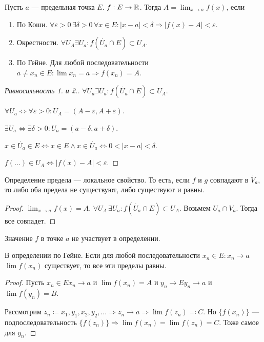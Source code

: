 \begin{definition}
    Пусть $a$ --- предельная точка  $E$.  $f: E \to \mathbb{R}$. Тогда  $A = \lim_{x\to a} f(x)$, если
     \begin{enumerate}
         \item По Коши. $\forall \varepsilon > 0\, \exists \delta >0 \, \forall x \in E: |x-a| < \delta \Rightarrow |f(x) - A| < \varepsilon$.
         \item Окрестности. $\forall U_A \exists U_a: f(\dot{U_a} \cap E) \subset U_A$.
         \item По Гейне. Для любой последовательности  $a \neq x_n \in E: \lim x_n = a \Rightarrow f(x_n) = A$.
    \end{enumerate}
\end{definition}
\begin{proof}[Равносильность 1. и 2.]
    $\forall U_a \exists U_a: f(\dot{U_a} \cap E) \subset U_A$.  

    $\forall U_a \iff \forall \varepsilon > 0: U_A = (A - \varepsilon, A + \varepsilon)$. 

    $\exists U_a \iff \exists \delta > 0: U_a = (a - \delta, a + \delta)$.  

    $x \in \dot{U_a} \in E \iff x \in E \land x \in \dot{U_a} \iff 0 < |x-a|<\delta$.  

    $f(\ldots)\in U_A \iff |f(x) - A| < \varepsilon$.
\end{proof}
\begin{property}
    Определение предела --- локальное свойство. То есть, если $f$ и  $g$ совпадают в  $\dot{V_a}$, то либо оба предела не существуют, либо существуют и равны.
\end{property}
\begin{proof}
    $\lim_{x\to a} f(x) = A$.  $\forall U_A \, \exists U_a: f(\dot{U_a} \cap E) \subset U_A$. Возьмем $U_a \cap V_a$. Тогда все совпадет.
\end{proof}
\begin{property}
    Значение $f$ в точке  $a$ не участвует в определении.
\end{property}
\begin{property}
    В определении по Гейне. Если для любой последовательности $x_n \in E: x_n \to a$  $\lim f(x_n)$ существует, то все эти пределы равны.
\end{property}
\begin{proof}
    Пусть $x_n \in E x_n \to a$ и  $\lim f(x_n) = A$ и  $y_n \to E y_n \to a$ и  $\lim f(y_n) = B$.

    Рассмотрим  $z_n \coloneqq x_1, y_1, x_2, y_2,\ldots \Rightarrow z_n \to a \Rightarrow \lim f(z_n) \eqqcolon C$. Но $\{f(x_n)\}$ --- подпоследовательность  $\{f(z_n)\} \Rightarrow \lim f(x_n) = \lim f(z_n) = C$. Тоже самое для  $y_n$.
\end{proof}
